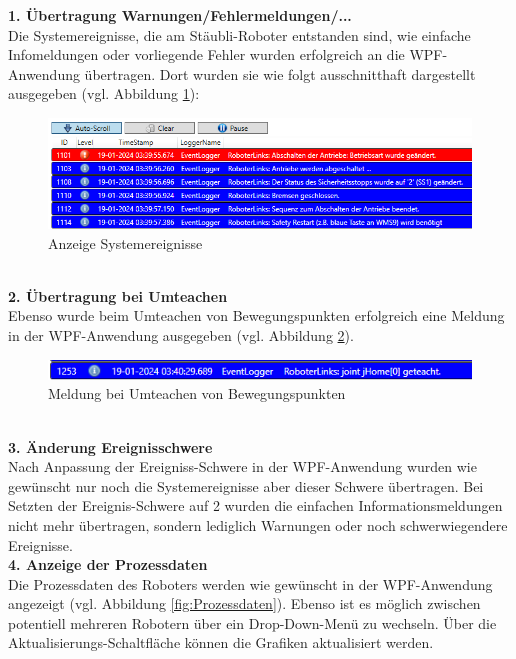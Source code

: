 \documentclass[ a4paper,
                oneside,
                toc=bibliography,
                toc=listof
                ]{scrbook}
\begin{document}
   	\textbf{1. Übertragung Warnungen/Fehlermeldungen/...}\\
   	Die Systemereignisse, die am Stäubli-Roboter entstanden sind, wie einfache Infomeldungen oder vorliegende Fehler wurden erfolgreich an die WPF-Anwendung übertragen. Dort wurden sie wie folgt ausschnitthaft dargestellt ausgegeben (vgl. Abbildung \ref{fig:AnzeigeEvents}):
   	\begin{figure}[!h]
   		\centering
   		\includegraphics[width=1\linewidth]{./images/Fehlermeldung.png}
   		\caption{Anzeige Systemereignisse}
   		\label{fig:AnzeigeEvents}
   	\end{figure}\\
   	\textbf{2. Übertragung bei Umteachen}\\
   	Ebenso wurde beim Umteachen von Bewegungspunkten erfolgreich eine Meldung in der WPF-Anwendung ausgegeben (vgl. Abbildung \ref{fig:Umteachen}).
   	\begin{figure}[!h]
   		\centering
   		\includegraphics[width=1\linewidth]{./images/Umteachen.png}
   		\caption{Meldung bei Umteachen von Bewegungspunkten}
   		\label{fig:Umteachen}
   	\end{figure}\\
   	\textbf{3. Änderung Ereignisschwere}\\
   	Nach Anpassung der Ereigniss-Schwere in der WPF-Anwendung wurden wie gewünscht nur noch die Systemereignisse aber dieser Schwere übertragen. Bei Setzten der Ereignis-Schwere auf 2 wurden die einfachen Informationsmeldungen nicht mehr übertragen, sondern lediglich Warnungen oder noch schwerwiegendere Ereignisse.\vspace{0.5\baselineskip}\\
   	\clearpage
   	\noindent
   	\textbf{4. Anzeige der Prozessdaten}\\
   	Die Prozessdaten des Roboters werden wie gewünscht in der WPF-Anwendung angezeigt (vgl. Abbildung \ref{fig:Prozessdaten}). Ebenso ist es möglich zwischen potentiell mehreren Robotern über ein Drop-Down-Menü zu wechseln. Über die Aktualisierungs-Schaltfläche können die Grafiken aktualisiert werden.
\end{document}
